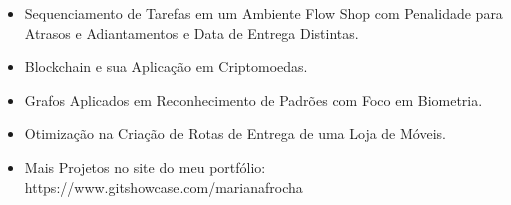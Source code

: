 \documentclass[10pt,a4paper,ragged2e]{altacv}
\begin{document}
\bigskip

\smallskip
{}
\smallskip
{}

\bigskip

\smallskip
{}

\bigskip

\smallskip
\begin{itemize}
\item Sequenciamento de Tarefas em um Ambiente Flow Shop com Penalidade para Atrasos e Adiantamentos e Data de Entrega Distintas.
\smallskip
\item Blockchain e sua Aplicação em Criptomoedas.
\smallskip
\item Grafos Aplicados em Reconhecimento de Padrões com Foco em Biometria.
\smallskip
\item Otimização na Criação de Rotas de Entrega de uma Loja de Móveis.
\smallskip
\item Mais Projetos no site do meu portfólio: \newline https://www.gitshowcase.com/marianafrocha 
\smallskip
\end{itemize}
\bigskip






\end{document}
